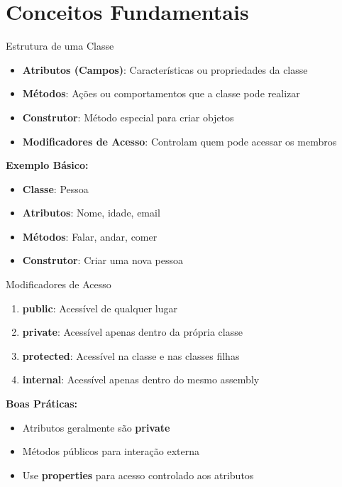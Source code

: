 \documentclass[aspectratio=169]{beamer}
\begin{document}
\section{Conceitos Fundamentais}

\begin{frame}{Estrutura de uma Classe}
\begin{itemize}
\item \textbf{Atributos (Campos)}: Características ou propriedades da classe
\item \textbf{Métodos}: Ações ou comportamentos que a classe pode realizar
\item \textbf{Construtor}: Método especial para criar objetos
\item \textbf{Modificadores de Acesso}: Controlam quem pode acessar os membros
\end{itemize}

\vspace{0.3cm}
\textbf{Exemplo Básico:}
\begin{itemize}
\item \textbf{Classe}: Pessoa
\item \textbf{Atributos}: Nome, idade, email
\item \textbf{Métodos}: Falar, andar, comer
\item \textbf{Construtor}: Criar uma nova pessoa
\end{itemize}
\end{frame}

\begin{frame}{Modificadores de Acesso}
\begin{enumerate}
\item \textbf{public}: Acessível de qualquer lugar
\item \textbf{private}: Acessível apenas dentro da própria classe
\item \textbf{protected}: Acessível na classe e nas classes filhas
\item \textbf{internal}: Acessível apenas dentro do mesmo assembly
\end{enumerate}

\vspace{0.5cm}
\textbf{Boas Práticas:}
\begin{itemize}
\item Atributos geralmente são \textbf{private}
\item Métodos públicos para interação externa
\item Use \textbf{properties} para acesso controlado aos atributos
\end{itemize}
\end{frame}
\end{document}
